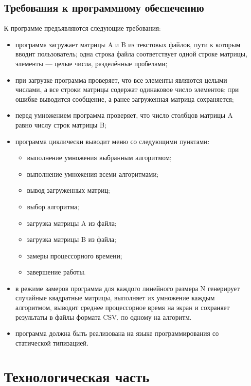 \documentclass{bmstu}
\begin{document}
\section{Требования к программному обеспечению}
К программе предъявляются следующие требования:
\begin{itemize}
	\item программа загружает матрицы A и B из текстовых файлов, пути
	      к которым вводит пользователь; одна строка файла соответствует
	      одной строке матрицы, элементы — целые числа, разделённые
	      пробелами;
	\item при загрузке программа проверяет, что все элементы являются
	      целыми числами, а все строки матрицы содержат одинаковое число
	      элементов; при ошибке выводится сообщение, а ранее загруженная
	      матрица сохраняется;
	\item перед умножением программа проверяет, что число столбцов
	      матрицы A равно числу строк матрицы B;
	\item программа циклически выводит меню со следующими пунктами:
	      \begin{itemize}
		      \item выполнение умножения выбранным алгоритмом;
		      \item выполнение умножения всеми алгоритмами;
		      \item вывод загруженных матриц;
		      \item выбор алгоритма;
		      \item загрузка матрицы A из файла;
		      \item загрузка матрицы B из файла;
		      \item замеры процессорного времени;
		      \item завершение работы.
	      \end{itemize}
	\item  в режиме замеров программа для каждого линейного размера N
	      генерирует случайные квадратные матрицы, выполняет их
	      умножение каждым алгоритмом, выводит среднее процессорное
	      время на экран и сохраняет результаты в файлы формата CSV, по
	      одному на алгоритм.
	\item программа должна быть реализована на языке программирования со статической типизацией.
\end{itemize}

\chapter{Технологическая часть}
\end{document}
